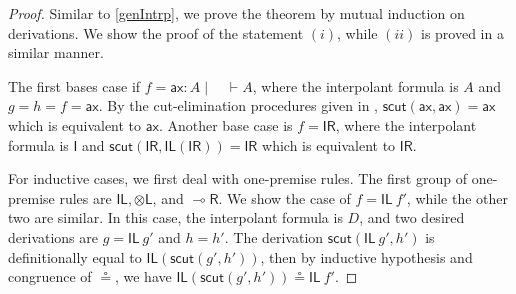 \documentclass[sn-mathphys-num]{sn-jnl}%
\newcommand{\vd}{\vdash}
\newcommand{\tl}{\otimes \mathsf{L}}
\newcommand{\unitl}{\mathsf{IL}}
\newcommand{\unitr}{\mathsf{IR}}
\newcommand{\ax}{\mathsf{ax}}
\newcommand{\lolli}{\multimap}
\newcommand{\lright}{{\lolli}\mathsf{R}}
\newcommand{\unit}{\mathsf{I}}
\newcommand{\mf}[1]{\mathsf{#1}}
\theoremstyle{thmstyleone}%
\theoremstyle{thmstyletwo}%
\theoremstyle{thmstylethree}%
\begin{document}
\begin{proof}
Similar to \ref{genIntrp}, we prove the theorem by mutual induction on derivations.
We show the proof of the statement $(i)$, while $(ii)$ is proved in a similar manner.

The first bases case if $f = \ax : A \mid \quad \vd A$, where the interpolant formula is $A$ and $g = h = f = \ax$. By the cut-elimination procedures given in \cite{UVW:protsn,wan2024}, $\mf{scut} (\ax , \ax) = \ax$ which is equivalent to $\ax$.
Another base case is $f = \unitr$, where the interpolant formula is $\unit$ and $\mf{scut} (\unitr , \unitl (\unitr)) = \unitr$ which is equivalent to $\unitr$.

For inductive cases, we first deal with one-premise rules.
The first group of one-premise rules are $\unitl, \tl$, and $\lright$.
We show the case of $f = \unitl \ f'$, while the other two are similar.
In this case, the interpolant formula is $D$, and two desired derivations are $g = \unitl \ g'$ and $h = h'$.
The derivation $\mf{scut} (\unitl \ g', h')$ is definitionally equal to $\unitl (\mf{scut} (g' , h'))$, then by inductive hypothesis and congruence of $\circeq$, we have $\unitl (\mf{scut} (g' , h')) \circeq \unitl \ f'$.


\end{proof}
\end{document}
